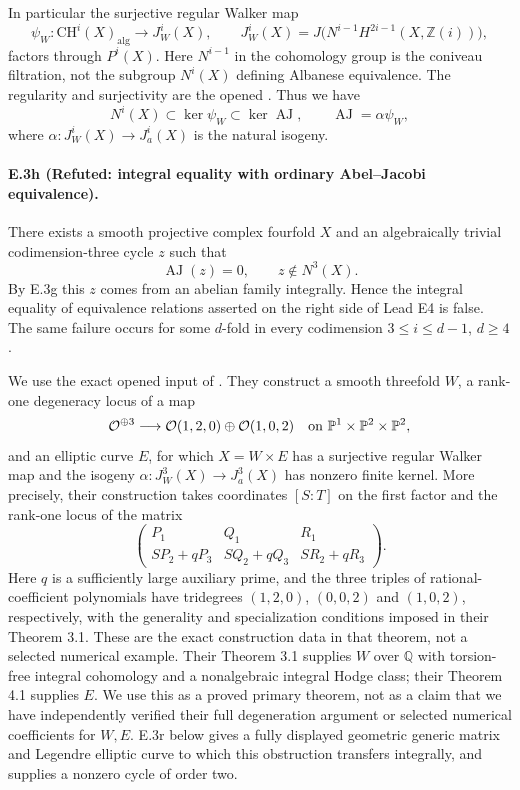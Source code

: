 In particular the surjective regular Walker map
\[
 \psi_W:\mathrm{CH}^i(X)_{\mathrm{alg}}\longrightarrow J_W^i(X),
 \qquad
 J_W^i(X)=J\bigl(N^{i-1}H^{2i-1}(X,\mathbb Z(i))\bigr),
\]
factors through $P^i(X)$. Here $N^{i-1}$ in the cohomology group
is the coniveau filtration, not the subgroup $N^i(X)$ defining
Albanese equivalence. The regularity and surjectivity are the
opened \citet[Theorem 1.1, pp.~2--3; Corollaries 2.5--2.6,
pp.~7--8]{cySuzuki2021}. Thus we have
\[
 N^i(X)\subset\ker\psi_W\subset\ker\operatorname{AJ},
 \qquad
 \operatorname{AJ}=\alpha\psi_W,
\]
where $\alpha:J_W^i(X)\to J_a^i(X)$ is the natural isogeny.

\paragraph{E.3h (Refuted: integral equality with ordinary Abel--Jacobi equivalence).}
There exists a smooth projective complex fourfold $X$ and an
algebraically trivial codimension-three cycle $z$ such that
\[
 \operatorname{AJ}(z)=0,
 \qquad z\notin N^3(X).
\]
By E.3g this $z$ comes from an abelian family integrally. Hence the
integral equality of equivalence relations asserted on the right
side of Lead E4 is false. The same failure occurs for some
$d$-fold in every codimension $3\le i\le d-1$, $d\ge4$.

We use the exact opened input of
\citet[Corollary 4.2 and Remark 4.3, author p.~10]{cyOttemSuzuki2020}.
They construct a smooth threefold $W$, a rank-one degeneracy locus
of a map
\[
 \mathcal O^{\oplus3}\longrightarrow
 \mathcal O(1,2,0)\oplus\mathcal O(1,0,2)
 \quad\hbox{on }\mathbb P^1\times\mathbb P^2\times\mathbb P^2,
\]
and an elliptic curve $E$, for which $X=W\times E$ has a
surjective regular Walker map and the isogeny
$\alpha:J_W^3(X)\to J_a^3(X)$ has nonzero finite kernel.
More precisely, their construction takes coordinates $[S:T]$
on the first factor and the rank-one locus of the matrix
\[
 \begin{pmatrix}
 P_1&Q_1&R_1\\
 SP_2+qP_3&SQ_2+qQ_3&SR_2+qR_3
 \end{pmatrix}.
\]
Here $q$ is a sufficiently large auxiliary prime, and the three
triples of rational-coefficient polynomials have tridegrees
$(1,2,0)$, $(0,0,2)$ and $(1,0,2)$, respectively, with the
generality and specialization conditions imposed in their
Theorem 3.1. These are the exact construction data in that
theorem, not a selected numerical example.
Their Theorem 3.1 supplies $W$ over $\mathbb Q$ with torsion-free
integral cohomology and a nonalgebraic integral Hodge class; their
Theorem 4.1 supplies $E$. We use this as a proved primary theorem,
not as a claim that we have independently verified their full
degeneration argument or selected numerical coefficients for $W,E$.
E.3r below gives a fully displayed geometric generic matrix and
Legendre elliptic curve to which this obstruction transfers
integrally, and supplies a nonzero cycle of order two.

